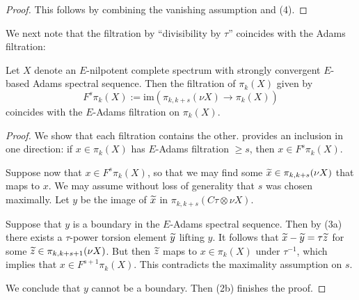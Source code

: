 \begin{proof}
    This follows by combining the vanishing assumption and (4).
\end{proof}

We next note that the filtration by ``divisibility by $\tau$'' coincides with the Adams filtration:

\begin{cor}\label{cor:synth-filt}
  Let $X$ denote an $E$-nilpotent complete spectrum with strongly convergent $E$-based Adams spectral sequence.
  Then the filtration of $\pi_k(X)$ given by
  $$ F^s \pi_k(X) := \mathrm{im}(\pi_{k,k+s}(\nu X) \to \pi_k(X)) $$
  coincides with the $E$-Adams filtration on $\pi_k(X)$.
\end{cor}

\begin{proof}
  We show that each filtration contains the other.
   provides an inclusion in one direction: if $x \in \pi_k(X)$ has $E$-Adams filtration $\geq s$, then $x \in F^s\pi_k(X)$.

    Suppose now that $x \in F^s \pi_{k} (X)$, so that we may find some $\wt{x} \in \pi_{k,k+s} (\nu X)$ that maps to $x$. We may assume without loss of generality that $s$ was chosen maximally. Let $y$ be the image of $\wt{x}$ in $\pi_{k,k+s} (C\tau \otimes \nu X)$.

    Suppose that $y$ is a boundary in the $E$-Adams spectral sequence. Then by (3a) there exists a $\tau$-power torsion element $\wt{y}$ lifting $y$. It follows that $\wt{x}-\wt{y} = \tau \wt{z}$ for some $\wt{z} \in \pi_{k,k+s+1} (\nu X)$. But then $\wt{z}$ maps to $x \in \pi_k (X)$ under $\tau^{-1}$, which implies that $x \in F^{s+1} \pi_{k} (X)$. This contradicts the maximality assumption on $s$.

    We conclude that $y$ cannot be a boundary. Then (2b) finishes the proof.
%
%
\end{proof}

